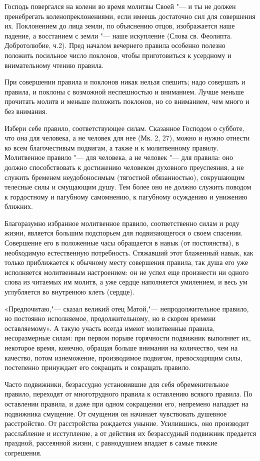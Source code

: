 \begin{mymulticols}
Господь повергался на колени во время молитвы Своей "--- и ты не должен пренебрегать коленопреклонениями, если имеешь достаточно сил для совершения их. Поклонением до лица земли, по объяснению отцов, изображается наше падение, а восстанием с земли "--- наше искупление (Слова св. Феолипта. Добротолюбие, ч.2). Пред началом вечернего правила особенно полезно положить посильное число поклонов, чтобы приготовиться к усердному и внимательному чтению правила.

При совершении правила и поклонов никак нельзя спешить; надо совершать и правила, и поклоны с возможной неспешностью и вниманием. Лучше меньше прочитать молитв и меньше положить поклонов, но со вниманием, чем много и без внимания.

Избери себе правило, соответствующее силам. Сказанное Господом о субботе, что она для человека, а не человек для нее (Мк. 2, 27), можно и нужно отнести ко всем благочестивым подвигам, а также и к молитвенному правилу. Молитвенное правило "--- для человека, а не человек "--- для правила: оно должно способствовать к достижению человеком духовного преуспеяния, а не служить бременем неудобоносимым (тягостной обязанностью), сокрушающим телесные силы и смущающим душу. Тем более оно не должно служить поводом к гордостному и пагубному самомнению, к пагубному осуждению и унижению ближних.

Благоразумно избранное молитвенное правило, соответственно силам и роду жизни, является большим подспорьем для подвизающегося о своем спасении. Совершение его в положенные часы обращается в навык (от постоянства), в необходимую естественную потребность. Стяжавший этот блаженный навык, как только приближается к обычному месту совершения правила, так душа его уже исполняется молитвенным настроением: он не успел еще произнести ни одного слова из читаемых им молитв, а уже сердце наполняется умилением, и весь ум углубляется во внутренюю клеть (сердце).

«Предпочитаю,"--- сказал великий отец Матой,"--- непродолжительное правило, но постоянно исполняемое, продолжительному, но в скором времени оставляемому». А такую участь всегда имеют молитвенные правила, несоразмерные силам: при первом порыве горячности подвижник выполняет их, некоторое время, конечно, обращая больше внимания на количество, чем на качество, потом изнеможение, производимое подвигом, превосходящим силы, постепенно принуждает его сокращать и сокращать правило.

Часто подвижники, безрассудно установившие для себя обременительное правило, переходят от многотрудного правила к оставлению всякого правила. По оставлении правила, и даже при одном сокращении его, непремено нападает на подвижника смущение. От смущения он начинает чувствовать душевное расстройство. От расстройства рождается уныние. Усилившись, оно производит расслабление и исступление, а от действия их безрассудный подвижник предается праздной, рассеянной жизни, с равнодушием впадает в самые тяжкие согрешения.


\end{mymulticols}
